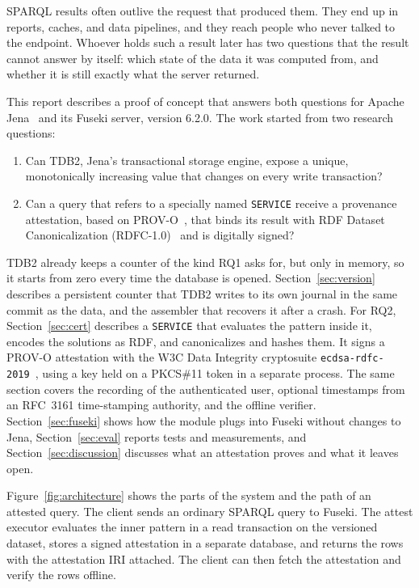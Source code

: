 \documentclass[11pt,a4paper]{article}
\newcommand{\code}[1]{\texttt{#1}}
\begin{document}
SPARQL results often outlive the request that produced them. They end up in reports, caches,
and data pipelines, and they reach people who never talked to the endpoint. Whoever holds such
a result later has two questions that the result cannot answer by itself: which state of the
data it was computed from, and whether it is still exactly what the server returned.

This report describes a proof of concept that answers both questions for Apache
Jena~\cite{jena} and its Fuseki server, version 6.2.0. The work started from two research
questions:

\begin{enumerate}[label=\textbf{RQ\arabic*}, leftmargin=3em]
\item Can TDB2, Jena's transactional storage engine, expose a unique, monotonically increasing
  value that changes on every write transaction?
\item Can a query that refers to a specially named \code{SERVICE} receive a provenance
  attestation, based on PROV-O~\cite{provo}, that binds its result with RDF Dataset
  Canonicalization (RDFC-1.0)~\cite{rdfc} and is digitally signed?
\end{enumerate}

TDB2 already keeps a counter of the kind RQ1 asks for, but only in memory, so it starts from
zero every time the database is opened. Section~\ref{sec:version} describes a persistent
counter that TDB2 writes to its own journal in the same commit as the data, and the assembler
that recovers it after a crash. For RQ2, Section~\ref{sec:cert} describes a \code{SERVICE}
that evaluates the pattern inside it, encodes the solutions as RDF, and canonicalizes and
hashes them. It signs a PROV-O attestation with the W3C Data Integrity cryptosuite
\code{ecdsa-rdfc-2019}~\cite{vcdi,ecdsa}, using a key held on a PKCS\#11 token in a separate
process. The same section covers the recording of the authenticated user, optional
timestamps from an RFC~3161 time-stamping authority, and the offline verifier.
Section~\ref{sec:fuseki} shows how the module plugs into Fuseki without changes to Jena,
Section~\ref{sec:eval} reports tests and measurements, and Section~\ref{sec:discussion}
discusses what an attestation proves and what it leaves open.

Figure~\ref{fig:architecture} shows the parts of the system and the path of an attested query.
The client sends an ordinary SPARQL query to Fuseki. The attest executor evaluates the inner
pattern in a read transaction on the versioned dataset, stores a signed attestation in a
separate database, and returns the rows with the attestation IRI attached. The client can then
fetch the attestation and verify the rows offline.
\end{document}
